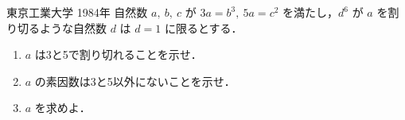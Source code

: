 \documentclass[a4paper]{ltjsarticle}
\begin{document}

\begin{itembox}[l]{東京工業大学 1984年}
    自然数 $a,\ b,\ c$ が $3a=b^3,\ 5a=c^2$ を満たし，$d^6$ が $a$ を割り切るような自然数 $d$ は $d=1$ に限るとする．

    \begin{enumerate}[label=(\arabic*)]
        \item $a$ は3と5で割り切れることを示せ．

        \item $a$ の素因数は3と5以外にないことを示せ．

        \item $a$ を求めよ．
    \end{enumerate}
\end{itembox}
\end{document}
